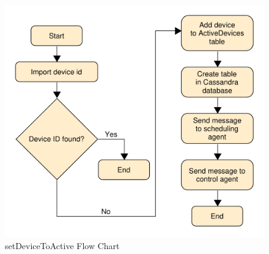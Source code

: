 \begin{figure}[H]
    \centering
    \includegraphics[scale=0.5]{figs/setDeviceToActive.pdf}
    \caption{setDeviceToActive Flow Chart}
    \label{fig:setDeviceToActive}
\end{figure}

